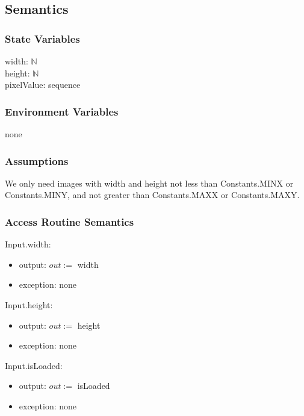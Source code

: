 \documentclass[12pt, titlepage]{article}
\begin{document}
\subsection{Semantics}

\subsubsection{State Variables}

width: $\mathbb{N}$\\
height: $\mathbb{N}$\\
pixelValue: sequence

\subsubsection{Environment Variables}

none

\subsubsection{Assumptions}

We only need images with width and height not less than Constants.MINX or
Constants.MINY, and not greater than Constants.MAXX or Constants.MAXY.

\subsubsection{Access Routine Semantics}

\noindent Input.width:
\begin{itemize}
\item output: $out:=$ width 
\item exception: none 
\end{itemize}

\noindent Input.height:
\begin{itemize}
\item output: $out:=$ height 
\item exception: none 
\end{itemize}

\noindent Input.isLoaded:
\begin{itemize}
\item output: $out:=$ isLoaded 
\item exception: none 
\end{itemize}
\end{document}
